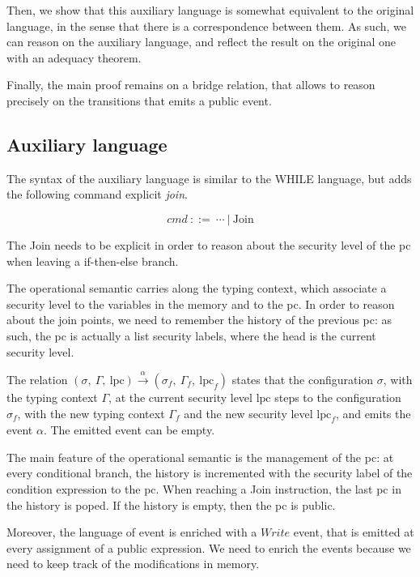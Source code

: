 \documentclass[10pt]{article}
\newcommand{\lpc}{\mathrm{lpc}}
\newcommand{\ctx}{\Gamma}
\newcommand{\conf}{\sigma}
\newcommand{\execaux}[7] { (#1,~#2,~#3) \xrightarrow{#4} (#5,~#6,~#7) }
\begin{document}
Then, we show that this auxiliary language is somewhat equivalent to the original language, in the
sense that there is a correspondence between them. As such, we can reason on the auxiliary language,
and reflect the result on the original one with an adequacy theorem.

Finally, the main proof remains on a bridge relation, that allows to reason precisely on the
transitions that emits a public event.

\subsection{Auxiliary language}%
\label{subsec:aux_lang}

The syntax of the auxiliary language is similar to the WHILE language, but adds the following
command explicit \emph{join}.

\[ \mathit{cmd}~::=~\cdots~|~\mathrm{Join} \]

The Join needs to be explicit in order to reason about the security level of the pc when leaving a
if-then-else branch.

The operational semantic carries along the typing context, which associate a security level to the
variables in the memory and to the pc. In order to reason about the join points, we need to remember
the history of the previous pc: as such, the pc is actually a list security labels, where the head
is the current security level.

The relation \(\execaux{\conf}{\ctx}{\lpc}{\alpha}{\conf_{f}}{\ctx_{f}}{\lpc_{f}} \)
states that the configuration $\conf$, with the typing context $\ctx$, at the current security level
$\lpc$ steps to the configuration $\conf_{f}$, with the new typing context $\ctx_{f}$ and the new
security level $\lpc_{f}$, and emits the event $\alpha$. The emitted event can be empty.


The main feature of the operational semantic is the management of the pc:
at every conditional branch, the history is incremented with the security label of the condition
expression to the pc.
When reaching a Join instruction, the last pc in the history is poped. If the history is empty, then
the pc is public.

Moreover, the language of event is enriched with a $Write$ event, that is emitted at every
assignment of a public expression. We need to enrich the events because we need to keep track of the
modifications in memory.
\end{document}
